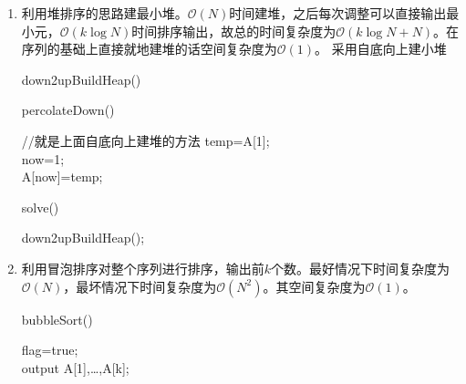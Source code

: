 \documentclass[12pt,a4paper]{article}
\theoremstyle{definition}
\begin{document}
\begin{enumerate}
	
	\item 利用堆排序的思路建最小堆。$\mathcal{O}(N)$时间建堆，之后每次调整可以直接输出最小元，$\mathcal{O}(k\log N)$时间排序输出，故总的时间复杂度为$\mathcal{O}(k\log N+N)$。在序列的基础上直接就地建堆的话空间复杂度为$\mathcal{O}(1)$。
	采用自底向上建小堆
	\begin{center}
		\begin{algorithm}[H]
			\caption{down2upBuildHeap()}
		\end{algorithm}
	\end{center}
	
	\begin{center}
		\begin{algorithm}[H]
			\caption{percolateDown()}
			//就是上面自底向上建堆的方法
			temp=A[1];\\
			now=1;\\
			A[now]=temp;
		\end{algorithm}
	\end{center}
	
	\begin{center}
		\begin{algorithm}[H]
			\caption{solve()}
			down2upBuildHeap();\\
		\end{algorithm}
	\end{center}
	
	
	\item 利用冒泡排序对整个序列进行排序，输出前$k$个数。最好情况下时间复杂度为$\mathcal{O}(N)$，最坏情况下时间复杂度为$\mathcal{O}(N^2)$。其空间复杂度为$\mathcal{O}(1)$。
	\begin{center}
		\begin{algorithm}[H]
			\caption{bubbleSort()}
			flag=true;\\
			output A[1],\ldots,A[k];
		\end{algorithm}
	\end{center}
	

\end{enumerate}
\end{document}
